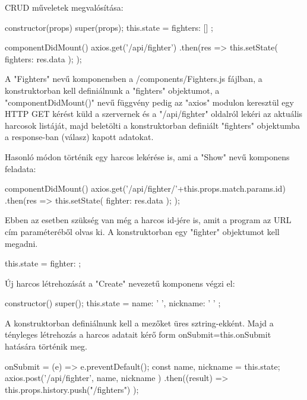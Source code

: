 
CRUD műveletek megvalósítása:

\begin{cpp}
constructor(props) {
    super(props);
    this.state = {
      fighters: []
    };
  }

  componentDidMount() {
    axios.get('/api/fighter')
      .then(res => {
        this.setState({ fighters: res.data });
      });
  }
\end{cpp}

A "Fighters" nevű komponensben a /components/Fighters.js fájlban, a konstruktorban kell definiálnunk a "fighters" objektumot, a "componentDidMount()" nevű függvény pedig az "axios" modulon keresztül egy HTTP GET kérést küld a szervernek és a "/api/fighter" oldalról lekéri az aktuális harcosok listáját, majd beletölti a konstruktorban definiált "fighters" objektumba a response-ban (válasz) kapott adatokat.

Hasonló módon történik egy harcos lekérése is, ami a "Show" nevű komponens feladata:

\begin{cpp}
componentDidMount() {
    axios.get('/api/fighter/'+this.props.match.params.id)
      .then(res => {
        this.setState({ fighter: res.data });
      });
  }
\end{cpp}

Ebben az esetben szükség van még a harcos id-jére is, amit a program az URL cím paraméteréből olvas ki. A konstruktorban egy "fighter" objektumot kell megadni.

\begin{cpp}
this.state = { fighter: {} };
\end{cpp}

Új harcos létrehozását a "Create" nevezetű komponens végzi el:

\begin{cpp}
constructor() {
    super();
    this.state = {
      name: ' ',
      nickname: ' '
    };}
\end{cpp}

A konstruktorban definiálnunk kell a mezőket üres sztring-ekként. Majd a tényleges létrehozás a harcos adatait kérő form onSubmit={this.onSubmit} hatására történik meg.

\begin{cpp}
onSubmit = (e) => {
    e.preventDefault();
    const { name, nickname} = this.state;
    axios.post('/api/fighter', { name, nickname })
      .then((result) => {
        this.props.history.push("/fighters")
      }); }
\end{cpp}

